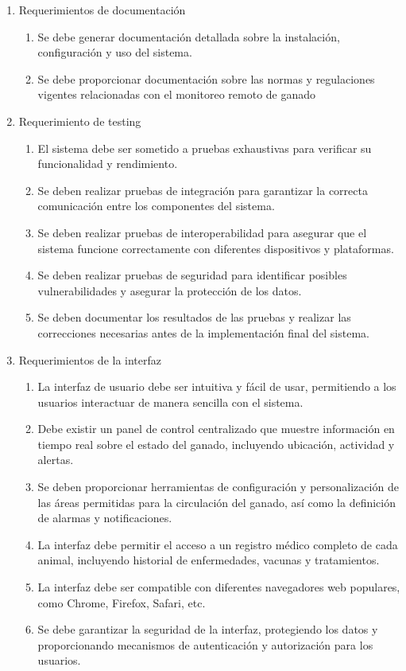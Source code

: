\documentclass[
11pt, %
]{charter}
\begin{document}
\begin{enumerate}
	\item Requerimientos de documentación
		\begin{enumerate}
			\item Se debe generar documentación detallada sobre la instalación, configuración y uso del sistema.
			\item Se debe proporcionar documentación sobre las normas y regulaciones vigentes relacionadas con el monitoreo remoto de ganado
		\end{enumerate}
		
	\item Requerimiento de testing
		\begin{enumerate}
			\item El sistema debe ser sometido a pruebas exhaustivas para verificar su funcionalidad y rendimiento.
			\item Se deben realizar pruebas de integración para garantizar la correcta comunicación entre los componentes del sistema.
			\item Se deben realizar pruebas de interoperabilidad para asegurar que el sistema funcione correctamente con diferentes dispositivos y plataformas.
			\item Se deben realizar pruebas de seguridad para identificar posibles vulnerabilidades y asegurar la protección de los datos.
			\item Se deben documentar los resultados de las pruebas y realizar las correcciones necesarias antes de la implementación final del sistema.
		\end{enumerate}
		
	\item Requerimientos de la interfaz
		\begin{enumerate}			
			\item La interfaz de usuario debe ser intuitiva y fácil de usar, permitiendo a los usuarios interactuar de manera sencilla con el sistema.
			\item Debe existir un panel de control centralizado que muestre información en tiempo real sobre el estado del ganado, incluyendo ubicación, actividad y alertas.
			\item  Se deben proporcionar herramientas de configuración y personalización de las áreas permitidas para la circulación del ganado, así como la definición de alarmas y notificaciones.
			\item La interfaz debe permitir el acceso a un registro médico completo de cada animal, incluyendo historial de enfermedades, vacunas y tratamientos.
			\item La interfaz debe ser compatible con diferentes navegadores web populares, como Chrome, Firefox, Safari, etc.
			\item Se debe garantizar la seguridad de la interfaz, protegiendo los datos y proporcionando mecanismos de autenticación y autorización para los usuarios.
		\end{enumerate}
		
\end{enumerate}
\end{document}
